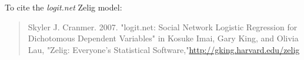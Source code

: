 To cite the \emph{ logit.net } Zelig model:
 \begin{verse}
 Skyler J. Cranmer. 2007. "logit.net: Social Network Logistic Regression for Dichotomous Dependent Variables" in Kosuke Imai, Gary King, and Olivia Lau, "Zelig: Everyone's Statistical Software,"\url{http://gking.harvard.edu/zelig} 
\end{verse}